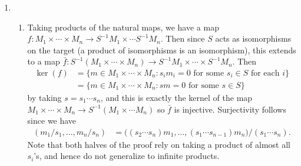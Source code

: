\documentclass{report}
\newcommand{\induced}[1]{\bar{#1}} %
\begin{document}
\begin{enumerate}[label=\textbf{1.3.\Alph*.}]
	\item
	      \begin{enumerate}[label=(\alph*)]
		      \item Taking products of the natural maps, we have a map
		            $f:M_1\times\cdots\times M_n\to S^{-1}M_1\times\cdots S^{-1}M_n$.
		            Then since $S$ acts as isomorphisms on the target (a product
		            of isomorphisms is an isomorphism), this extends to a map
		            $\induced{f}:S^{-1}(M_1\times\cdots\times M_n)\to S^{-1}M_1\times\cdots\times S^{-1}M_n$.
		            Then
		            \begin{align*}
			            \ker(f) & = \{m\in M_1\times\cdots\times M_n:
			            \text{$s_im_i=0$ for some $s_i\in S$ for each $i$}\} \\
			                    & = \{m\in M_1\times\cdots\times M_n:
			            \text{$sm=0$ for some $s\in S$}\}
		            \end{align*}
		            by taking $s=s_1\cdots s_n$, and this is exactly the kernel
		            of the map $M_1\times\cdots\times M_n\to S^{-1}(M_1\times\cdots M_n)$
		            so $\induced{f}$ is injective. Surjectivity follows since
		            we have
		            \begin{align*}
			            (m_1/s_1,\ldots,m_n/s_n) & =
			            \bigl((s_2\cdots s_n)m_1,
			            \ldots,
			            (s_1\cdots s_{n-1})m_n\bigr)/(s_1\cdots s_n).
		            \end{align*}
		            Note that both halves of the proof rely on taking a product
		            of almost all $s_i$'s, and hence do not generalize to infinite
		            products.


\end{enumerate}
\end{enumerate}
\end{document}
